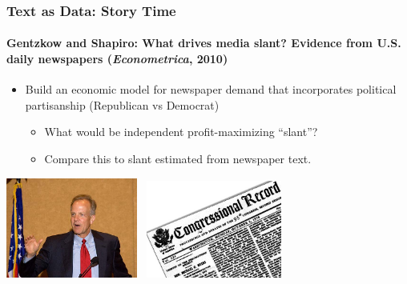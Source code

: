 \documentclass[
  shownotes,
  xcolor={svgnames},
  hyperref={colorlinks,citecolor=DarkBlue,linkcolor=DarkRed,urlcolor=DarkBlue}
  , aspectratio=169]{beamer}
\newcommand{\bk}{\color{black}}
\newcommand{\rd}{\color{red}}
\newcommand{\bl}{\color{blue}}
\begin{document}
\begin{frame}[fragile]
\frametitle{Text as Data: Story Time}
\framesubtitle{Gentzkow and Shapiro: What drives media slant?  Evidence from
U.S. daily newspapers ({\it Econometrica}, 2010)}

\begin{itemize}
\item Build an economic model for newspaper demand that incorporates political partisanship (\rd Republican \bk vs \bl Democrat\bk)


 
\begin{itemize}
\item What would be independent profit-maximizing ``slant''?
\item Compare this to slant estimated from newspaper text.
\end{itemize}
\end{itemize}

\begin{center}
\includegraphics[width=1.7in]{figures/moran}
~\includegraphics[width=1.75in]{figures/record}
\end{center}


 \end{frame}
\end{document}
